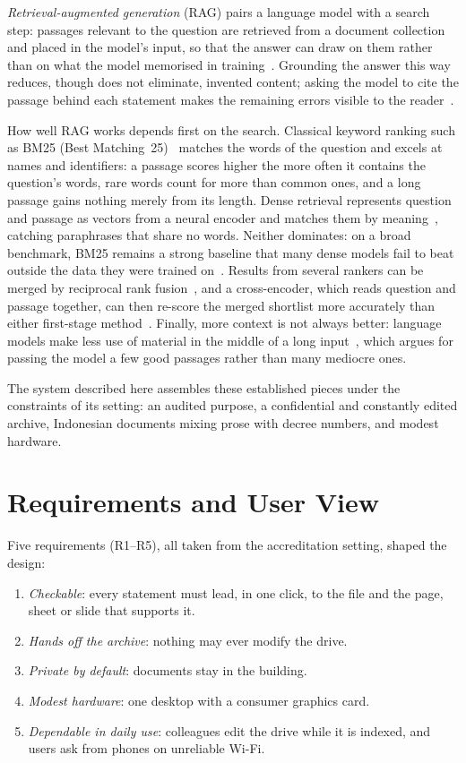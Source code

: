 \documentclass[conference]{IEEEtran}
\begin{document}
\emph{Retrieval-augmented generation} (RAG) pairs a language model with a search
step: passages relevant to the question are retrieved from a document
collection and placed in the model's input, so that the answer can draw on them
rather than on what the model memorised in training~\cite{lewis,gaosurvey}.
Grounding the answer this way reduces, though does not eliminate, invented
content; asking the model to cite the passage behind each statement makes the
remaining errors visible to the reader~\cite{alce}.

How well RAG works depends first on the search. Classical keyword ranking such
as BM25 (Best Matching~25)~\cite{bm25} matches the words of the question and
excels at names and identifiers: a passage scores higher the more often it
contains the question's words, rare words count for more than common ones, and
a long passage gains nothing merely from its length. Dense retrieval represents question and passage as vectors from a
neural encoder and matches them by meaning~\cite{dpr}, catching paraphrases that
share no words. Neither dominates: on a broad benchmark, BM25 remains a strong
baseline that many dense models fail to beat outside the data they were trained
on~\cite{beir}. Results from several rankers can be merged by reciprocal rank
fusion~\cite{rrf}, and a cross-encoder, which reads question and passage
together, can then re-score the merged shortlist more accurately than either
first-stage method~\cite{nogueira}. Finally, more context is not always better:
language models make less use of material in the middle of a long
input~\cite{liu}, which argues for passing the model a few good passages rather
than many mediocre ones.

The system described here assembles these established pieces under the
constraints of its setting: an audited purpose, a confidential and constantly
edited archive, Indonesian documents mixing prose with decree numbers, and
modest hardware.

\section{Requirements and User View}

Five requirements (R1--R5), all taken from the accreditation setting, shaped the
design:
\begin{enumerate}
\item[R1] \emph{Checkable}: every statement must lead, in one click, to the
  file and the page, sheet or slide that supports it.
\item[R2] \emph{Hands off the archive}: nothing may ever modify the drive.
\item[R3] \emph{Private by default}: documents stay in the building.
\item[R4] \emph{Modest hardware}: one desktop with a consumer graphics card.
\item[R5] \emph{Dependable in daily use}: colleagues edit the drive while it is
  indexed, and users ask from phones on unreliable Wi-Fi.
\end{enumerate}
\end{document}
